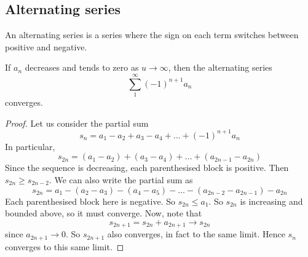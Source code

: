 \subsection{Alternating series}
An alternating series is a series where the sign on each term switches between positive and negative.
\begin{theorem}
	If \(a_n\) decreases and tends to zero as \(u \to \infty\), then the alternating series
	\[
		\sum_1^\infty (-1)^{n+1} a_n
	\]
	converges.
\end{theorem}
\begin{proof}
	Let us consider the partial sum
	\[
		s_n = a_1 - a_2 + a_3 - a_4 + \dots + (-1)^{n+1}a_n
	\]
	In particular,
	\[
		s_{2n} = (a_1 - a_2) + (a_3 - a_4) + \dots + (a_{2n-1} - a_{2n})
	\]
	Since the sequence is decreasing, each parenthesised block is positive.
	Then \(s_{2n} \geq s_{2n-2}\).
	We can also write the partial sum as
	\[
		s_{2n} = a_1 - (a_2 - a_3) - (a_4 - a_5) - \dots - (a_{2n-2} - a_{2n-1}) - a_{2n}
	\]
	Each parenthesised block here is negative.
	So \(s_{2n} \leq a_1\).
	So \(s_{2n}\) is increasing and bounded above, so it must converge.
	Now, note that
	\[
		s_{2n+1} = s_{2n} + a_{2n+1} \to s_{2n}
	\]
	since \(a_{2n+1} \to 0\).
	So \(s_{2n+1}\) also converges, in fact to the same limit.
	Hence \(s_n\) converges to this same limit.
\end{proof}
